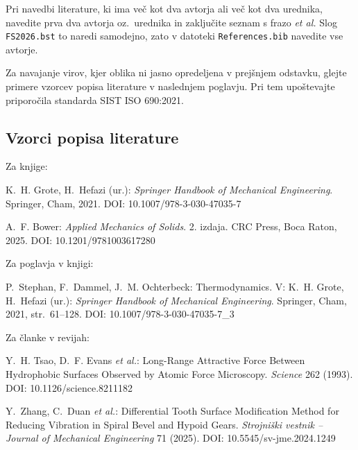 Pri navedbi literature, ki ima več kot dva avtorja ali več kot dva urednika, navedite prva dva avtorja oz.~urednika in zaključite seznam s frazo \emph{et al.} Slog \texttt{FS2026.bst} to naredi samodejno, zato v datoteki \texttt{References.bib} navedite vse avtorje.

Za navajanje virov, kjer oblika ni jasno opredeljena v prejšnjem odstavku, glejte primere vzorcev popisa literature v naslednjem poglavju. Pri tem upoštevajte priporočila standarda SIST ISO 690:2021.

\subsection*{Vzorci popisa literature}
\newenvironment{vzorecreferenc}%
  {\begin{list}{}{\setlength{\leftmargin}{10.5mm}\setlength{\itemindent}{-10.5mm}%
    \setlength{\itemsep}{6pt}\setlength{\parsep}{0pt}\setlength{\topsep}{0pt}}}%
  {\end{list}}

Za knjige:
\begin{vzorecreferenc}
\item K.~H. Grote, H.~Hefazi (ur.): \emph{Springer Handbook of Mechanical Engineering}. Springer, Cham, 2021. DOI: 10.1007/978-3-030-47035-7
\item A.~F. Bower: \emph{Applied Mechanics of Solids}. 2. izdaja. CRC Press, Boca Raton, 2025. DOI: 10.1201/9781003617280
\end{vzorecreferenc}

Za poglavja v knjigi:
\begin{vzorecreferenc}
\item P.~Stephan, F.~Dammel, J.~M. Ochterbeck: Thermodynamics. V: K.~H. Grote, H.~Hefazi (ur.): \emph{Springer Handbook of Mechanical Engineering}. Springer, Cham, 2021, str.~61--128. DOI: 10.1007/978-3-030-47035-7\_3
\end{vzorecreferenc}

Za članke v revijah:
\begin{vzorecreferenc}
\item Y.~H. Tsao, D.~F. Evans \emph{et al.}: Long-Range Attractive Force Between Hydrophobic Surfaces Observed by Atomic Force Microscopy. \emph{Science} 262 (1993). DOI: 10.1126/science.8211182
\item Y.~Zhang, C.~Duan \emph{et al.}: Differential Tooth Surface Modification Method for Reducing Vibration in Spiral Bevel and Hypoid Gears. \emph{Strojniški vestnik -- Journal of Mechanical Engineering} 71 (2025). DOI: 10.5545/sv-jme.2024.1249
\end{vzorecreferenc}

